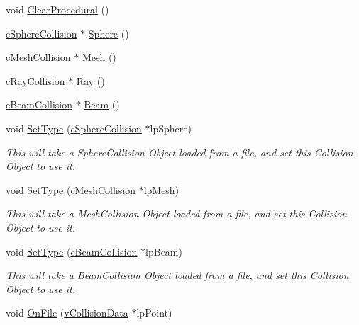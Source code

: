 \begin{DoxyCompactItemize}
void \hyperlink{classc_collision_object_a908a1cbe39b07c53849f60fecb5230dc}{ClearProcedural} ()
\item 
\hyperlink{classc_sphere_collision}{cSphereCollision} $\ast$ \hyperlink{classc_collision_object_afe43e12c0ea0da5c3653450cb8dfb047}{Sphere} ()
\item 
\hyperlink{classc_mesh_collision}{cMeshCollision} $\ast$ \hyperlink{classc_collision_object_a6ea07e3f2501b7092fed0130f150c4f4}{Mesh} ()
\item 
\hyperlink{classc_ray_collision}{cRayCollision} $\ast$ \hyperlink{classc_collision_object_ac46982867551f6dd05c0dbcae0e57796}{Ray} ()
\item 
\hyperlink{classc_beam_collision}{cBeamCollision} $\ast$ \hyperlink{classc_collision_object_a8a5a6900686ac3ac88cf6bdac71569ad}{Beam} ()
\item 
void \hyperlink{classc_collision_object_ae465362052ff2026ed31c2fa3664d209}{SetType} (\hyperlink{classc_sphere_collision}{cSphereCollision} $\ast$lpSphere)
\begin{DoxyCompactList}\small\item\em This will take a SphereCollision Object loaded from a file, and set this Collision Object to use it. \item\end{DoxyCompactList}\item 
void \hyperlink{classc_collision_object_a5c46dea7134fa466293938c22a780529}{SetType} (\hyperlink{classc_mesh_collision}{cMeshCollision} $\ast$lpMesh)
\begin{DoxyCompactList}\small\item\em This will take a MeshCollision Object loaded from a file, and set this Collision Object to use it. \item\end{DoxyCompactList}\item 
void \hyperlink{classc_collision_object_a4282627cb1818f66842f3c8ff91cd20e}{SetType} (\hyperlink{classc_beam_collision}{cBeamCollision} $\ast$lpBeam)
\begin{DoxyCompactList}\small\item\em This will take a BeamCollision Object loaded from a file, and set this Collision Object to use it. \item\end{DoxyCompactList}\item 
void \hyperlink{classc_collision_object_a8ef73a19857e4a35470502776b0f03f8}{OnFile} (\hyperlink{classv_collision_data}{vCollisionData} $\ast$lpPoint)
\item 

\end{DoxyCompactItemize}

